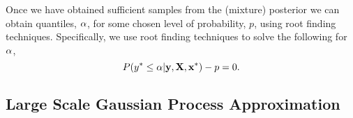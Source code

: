 \documentclass[11pt, oneside]{article}
\begin{document}
Once we have obtained sufficient samples from the (mixture) posterior we can
obtain quantiles, $\alpha$, for some chosen level of probability, $p$, using
root finding techniques. Specifically, we use root finding techniques to solve
the following for $\alpha$,
\begin{equation}
    P\!\left({y^{*} \leq \alpha}\middle\vert{\ensuremath{\mathbf{y}}, \ensuremath{\mathbf{X}}, \ensuremath{\mathbf{x}}\ensuremath{^{*}}}\right) - p = 0.
\end{equation}

\subsection{Large Scale Gaussian Process Approximation}


\end{document}
